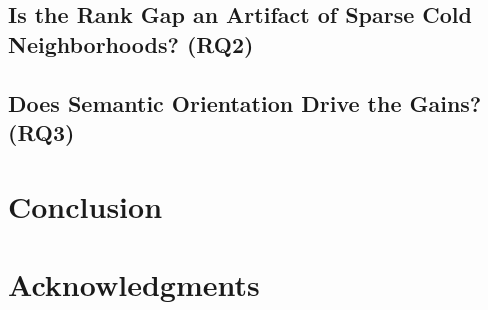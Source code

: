 \documentclass[letterpaper]{article} %
\begin{document}
\subsection{Is the Rank Gap an Artifact of Sparse Cold Neighborhoods? (RQ2)}


\subsection{Does Semantic Orientation Drive the Gains? (RQ3)}

\section{Conclusion}


\section{Acknowledgments}
\end{document}
